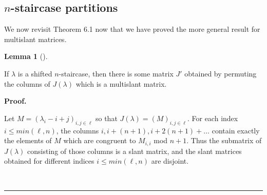 \documentclass[numbers=enddot,12pt,final,onecolumn,notitlepage]{scrartcl}%
\theoremstyle{definition}
\newtheorem{lem}[theo]{Lemma}
\newenvironment{lemma}[1][]
{\begin{lem}[#1]\begin{leftbar}}
{\end{leftbar}\end{lem}}
\newenvironment{proof}[1][Proof]{\noindent\textbf{#1.} }{\ \rule{0.5em}{0.5em}}
\renewcommand{\leq}{\leqslant}
\theoremstyle{plainsl}
\begin{document}
\subsection{$n$-staircase partitions}
We now revisit Theorem 6.1 now that we have proved the more general result for multislant matrices.
\begin{lemma}
\label{multistair}
If $\lambda$ is a shifted $n$-staircase, then there is some matrix $J'$ obtained by permuting the columns of $J(\lambda)$ which is a multislant matrix.
\end{lemma}
\begin{proof}

Let $M=\left(\lambda_{i}-i+j\right)_{i,j \in \ell}$ so that $J(\lambda) = \left( M\right)_{i,j \in \ell}$. For each index $i \leq min(\ell,n)$, the columns $i, i+(n+1), i+2(n+1) + \ldots$ contain exactly the elements of $M$ which are congruent to $M_{i,i}$ mod $n+1$. Thus the submatrix of $J(\lambda)$ consisting of those columns is a slant matrix, and the slant matrices obtained for different indices $i \leq min(\ell,n)$ are disjoint.















\end{proof}
\end{document}
